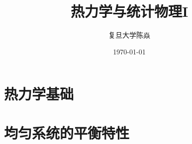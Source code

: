 \documentclass[UTF8]{ctexbook}
\title{
	\vspace{-4 cm}
	\myBold
	热力学与统计物理I
}
\author{
	\CJKfamily{楷体}
	复旦大学\phantom{空格}陈焱
}
\date{
	\CJKfamily{楷体}
	\today
}
\numberwithin{equation}{section}
\theoremstyle{empty} %
\theoremstyle{empty} %
\theoremstyle{plain} %
\let \oldInclude = 
\renewcommand{}[1]{{\let \clearpage = \relax \oldInclude{#1}}}
\begin{document}
%	
%			
%			
%			
%			
%			
		\chapter{热力学基础}
			
			
		\chapter{均匀系统的平衡特性}
			
			
%			
%			
%			
%			
		
\end{document}
